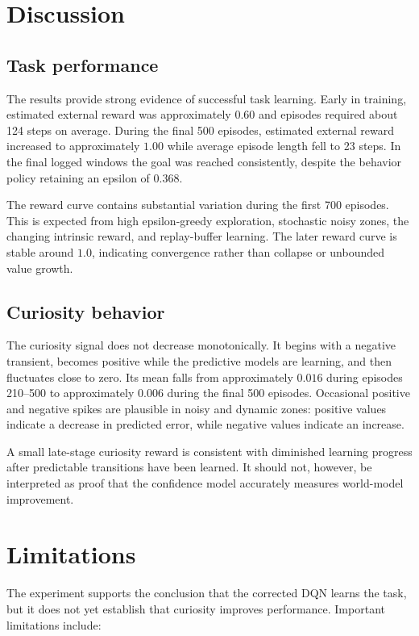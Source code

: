 \documentclass[11pt,a4paper]{article}
\begin{document}
\section{Discussion}

\subsection{Task performance}

The results provide strong evidence of successful task learning. Early in
training, estimated external reward was approximately $0.60$ and episodes
required about 124 steps on average. During the final 500 episodes, estimated
external reward increased to approximately $1.00$ while average episode length
fell to 23 steps. In the final logged windows the goal was reached consistently,
despite the behavior policy retaining an epsilon of $0.368$.

The reward curve contains substantial variation during the first 700 episodes.
This is expected from high epsilon-greedy exploration, stochastic noisy zones,
the changing intrinsic reward, and replay-buffer learning. The later reward
curve is stable around $1.0$, indicating convergence rather than collapse or
unbounded value growth.

\subsection{Curiosity behavior}

The curiosity signal does not decrease monotonically. It begins with a negative
transient, becomes positive while the predictive models are learning, and then
fluctuates close to zero. Its mean falls from approximately $0.016$ during
episodes 210--500 to approximately $0.006$ during the final 500 episodes.
Occasional positive and negative spikes are plausible in noisy and dynamic
zones: positive values indicate a decrease in predicted error, while negative
values indicate an increase.

A small late-stage curiosity reward is consistent with diminished learning
progress after predictable transitions have been learned. It should not,
however, be interpreted as proof that the confidence model accurately measures
world-model improvement.

\section{Limitations}

The experiment supports the conclusion that the corrected DQN learns the task,
but it does not yet establish that curiosity improves performance. Important
limitations include:
\end{document}
